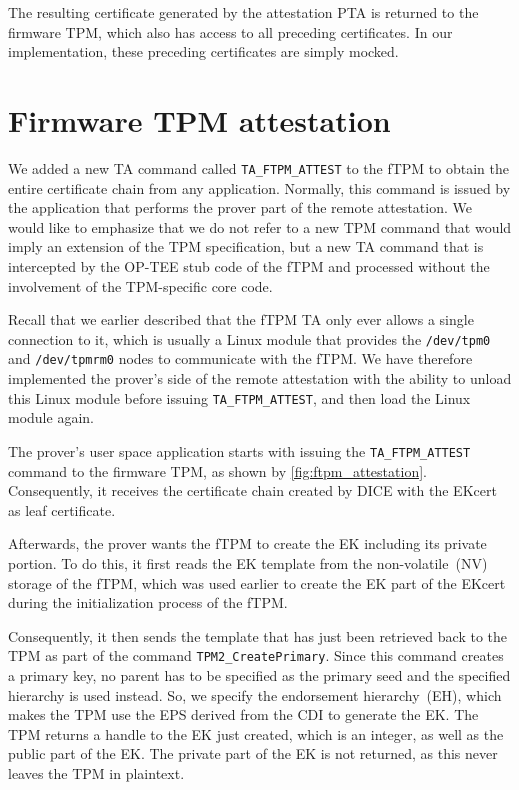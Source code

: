 The resulting certificate generated by the attestation PTA is returned to the firmware TPM, which also has access to all preceding certificates.
In our implementation, these preceding certificates are simply mocked.

\section{Firmware TPM attestation}\label{sec:impl_ftpm_attestation}



We added a new TA command called \texttt{TA\_FTPM\_ATTEST} to the \ac{fTPM} to obtain the entire certificate chain from any application.
Normally, this command is issued by the application that performs the prover part of the remote attestation.
We would like to emphasize that we do not refer to a new TPM command that would imply an extension of the TPM specification, but a new TA command that is intercepted by the OP-TEE stub code of the \ac{fTPM} and processed without the involvement of the TPM-specific core code.

Recall that we earlier described that the \ac{fTPM} TA only ever allows a single connection to it, which is usually a Linux module that provides the \texttt{/dev/tpm0} and \texttt{/dev/tpmrm0} nodes to communicate with the \ac{fTPM}\@.
We have therefore implemented the prover's side of the remote attestation with the ability to unload this Linux module before issuing \texttt{TA\_FTPM\_ATTEST}, and then load the Linux module again.

The prover's user space application starts with issuing the \texttt{TA\_FTPM\_ATTEST} command to the firmware TPM, as shown by \autoref{fig:ftpm_attestation}.
Consequently, it receives the certificate chain created by DICE with the EKcert as leaf certificate.

Afterwards, the prover wants the \ac{fTPM} to create the EK including its private portion.
To do this, it first reads the EK template from the non-volatile~(NV) storage of the fTPM, which was used earlier to create the EK part of the EKcert during the initialization process of the \ac{fTPM}.

Consequently, it then sends the template that has just been retrieved back to the TPM as part of the command \texttt{TPM2\_CreatePrimary}.
Since this command creates a primary key, no parent has to be specified as the primary seed and the specified hierarchy is used instead.
So, we specify the endorsement hierarchy~(EH), which makes the TPM use the \ac{EPS} derived from the \ac{CDI} to generate the \ac{EK}\@.
The TPM returns a handle to the \ac{EK} just created, which is an integer, as well as the public part of the \ac{EK}\@.
The private part of the \ac{EK} is not returned, as this never leaves the TPM in plaintext.

